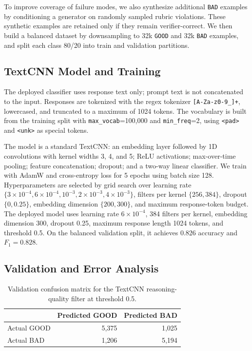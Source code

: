 To improve coverage of failure modes, we also synthesize additional \texttt{BAD} examples by conditioning a generator on randomly sampled rubric violations. These synthetic examples are retained only if they remain verifier-correct. We then build a balanced dataset by downsampling to 32k \texttt{GOOD} and 32k \texttt{BAD} examples, and split each class 80/20 into train and validation partitions.

\subsection{TextCNN Model and Training}
\label{subsec:textcnn-training}

The deployed classifier uses response text only; prompt text is not concatenated to the input. Responses are tokenized with the regex tokenizer \texttt{[A-Za-z0-9\_]+}, lowercased, and truncated to a maximum of 1024 tokens. The vocabulary is built from the training split with \texttt{max\_vocab}=100{,}000 and \texttt{min\_freq}=2, using \texttt{<pad>} and \texttt{<unk>} as special tokens.

The model is a standard TextCNN: an embedding layer followed by 1D convolutions with kernel widths 3, 4, and 5; ReLU activations; max-over-time pooling; feature concatenation; dropout; and a two-way linear classifier. We train with AdamW and cross-entropy loss for 5 epochs using batch size 128. Hyperparameters are selected by grid search over learning rate $\{3{\times}10^{-4},6{\times}10^{-4},10^{-3},2{\times}10^{-3},4{\times}10^{-3}\}$, filters per kernel $\{256,384\}$, dropout $\{0,0.25\}$, embedding dimension $\{200,300\}$, and maximum response-token budget. The deployed model uses learning rate $6{\times}10^{-4}$, 384 filters per kernel, embedding dimension 300, dropout 0.25, maximum response length 1024 tokens, and threshold 0.5. On the balanced validation split, it achieves 0.826 accuracy and $F_1=0.828$.

\subsection{Validation and Error Analysis}
\label{subsec:textcnn-error-analysis}

\begin{table}[t]
\centering
\caption{Validation confusion matrix for the TextCNN reasoning-quality filter at threshold 0.5.}
\label{tab:textcnn-confusion}
\begin{tabular}{lrr}
\toprule
 & Predicted GOOD & Predicted BAD \\
\midrule
Actual GOOD & 5{,}375 & 1{,}025 \\
Actual BAD  & 1{,}206 & 5{,}194 \\
\bottomrule
\end{tabular}
\end{table}

